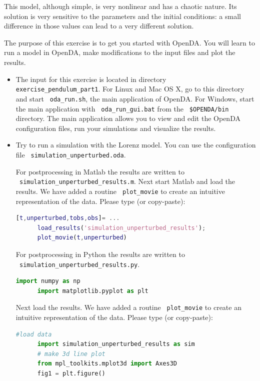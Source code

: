 This model, although simple, is very nonlinear and has a chaotic nature.  Its
solution is very sensitive to the parameters and the initial conditions: a
small difference in those values can lead to a very different solution.

The purpose of this exercise is to get you started with OpenDA. You will learn
to run a model in OpenDA, make modifications to the input files and plot the
results.

\begin{itemize}
\item The input for this exercise is located in directory \texttt{ exercise\_pendulum\_part1}.
      For Linux and Mac OS X, go to this directory and start \texttt{ oda\_run.sh}, the
      main application of OpenDA. For Windows, start the main application with 
      \texttt{ oda\_run\_gui.bat} from the \texttt{ \$OPENDA/bin} directory. The main 
      application allows you to view and edit the OpenDA configuration files, run your
      simulations and visualize the results.
\item Try to run a simulation with the Lorenz model. You can use the
      configuration file \texttt{ simulation\_unperturbed.oda}. 
      
      For postprocessing in Matlab the results are written to \\ \texttt{ simulation\_unperturbed\_results.m}.
      Next start Matlab and load the results. We have added a routine \texttt{ plot\_movie} to create an intuitive
      representation of the data. Please type (or copy-paste):
      \begin{lstlisting}[language=Matlab,frame=single,caption={Matlab}]
      [t,unperturbed,tobs,obs]= ...
      load_results('simulation_unperturbed_results');
      plot_movie(t,unperturbed)
      \end{lstlisting}
      
      For postprocessing in Python the results are written to \\ \texttt{ simulation\_unperturbed\_results.py}.
      \begin{lstlisting}[language=Python,frame=single,caption={Python initialize}]
      import numpy as np
      import matplotlib.pyplot as plt
      \end{lstlisting}
      Next load the results. We have added a routine \texttt{ plot\_movie} to create an intuitive
      representation of the data. Please type (or copy-paste):
      \begin{lstlisting}[language=Python,frame=single,caption={Python}]
      #load data
      import simulation_unperturbed_results as sim
      # make 3d line plot
      from mpl_toolkits.mplot3d import Axes3D
      fig1 = plt.figure()
      \end{lstlisting}
      

\end{itemize}
